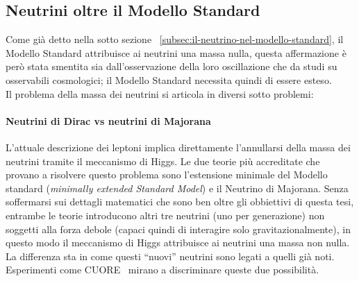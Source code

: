 \documentclass[../../main.tex]{subfiles}
\begin{document}
\subsection{Neutrini oltre il Modello Standard}
  \label{subsec:neutrini-oltre-il-modello-standard}
  Come già detto nella sotto sezione
  ~\ref{subsec:il-neutrino-nel-modello-standard}, il Modello Standard
  attribuisce ai neutrini una massa nulla, questa affermazione è però stata
  smentita sia dall'osservazione della loro oscillazione che da studi su
  osservabili cosmologici; il Modello Standard necessita quindi di essere
  esteso.\\
  Il problema della massa dei neutrini si articola in diversi sotto problemi:

  \paragraph{Neutrini di Dirac vs neutrini di Majorana \cite[Capitolo 6]
  {10.1093/acprof:oso/9780198508717.001.0001}}
    L'attuale descrizione dei leptoni implica direttamente l'annullarsi della
    massa dei neutrini tramite il meccanismo di Higgs.
    Le due teorie più accreditate che provano a risolvere questo problema sono
    l'estensione minimale del Modello standard (\textit{minimally
extended Standard Model}) e il Neutrino di Majorana.
    Senza soffermarsi sui dettagli matematici che sono ben oltre gli obbiettivi
    di questa tesi, entrambe le teorie introducono altri tre neutrini (uno per
    generazione) non soggetti alla forza debole (capaci quindi di interagire
    solo gravitazionalmente), in questo modo il meccanismo di Higgs attribuisce
    ai neutrini una massa non nulla.
    La differenza sta in come questi ``nuovi'' neutrini sono legati a quelli già
    noti.
    Esperimenti come CUORE~\cite{ADAMS2022103902} mirano a discriminare queste
    due possibilità.
\end{document}
